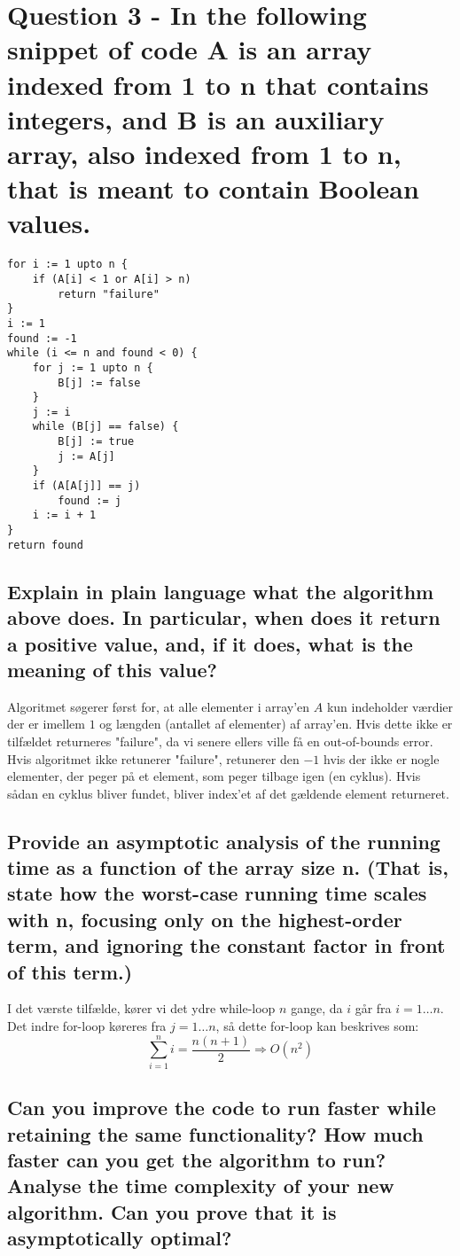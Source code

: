 \documentclass[a4paper,12pt]{article}
\begin{document}
\section[Question 3]{Question 3 - In the following snippet of code A is an array indexed from 1 to n that contains integers,
and B is an auxiliary array, also indexed from 1 to n, that is meant to contain Boolean values.}

\begin{lstlisting}
for i := 1 upto n {
    if (A[i] < 1 or A[i] > n)
        return "failure"
}
i := 1
found := -1
while (i <= n and found < 0) {
    for j := 1 upto n {
        B[j] := false
    }
    j := i
    while (B[j] == false) {
        B[j] := true
        j := A[j]
    }
    if (A[A[j]] == j)
        found := j
    i := i + 1
}
return found
\end{lstlisting}
    
\subsection[]{Explain in plain language what the algorithm above does. In particular, when does it
return a positive value, and, if it does, what is the meaning of this value?}
    
Algoritmet søgerer først for, at alle elementer i array'en $A$ kun indeholder værdier der er imellem $1$ og længden (antallet af elementer) af array'en. Hvis dette ikke er tilfældet returneres "failure", da vi senere ellers ville få en out-of-bounds error. Hvis algoritmet ikke retunerer "failure", retunerer den $-1$ hvis der ikke er nogle elementer, der peger på et element, som peger tilbage igen (en cyklus). Hvis sådan en cyklus bliver fundet, bliver index'et af det gældende element returneret.
    
\subsection[]{Provide an asymptotic analysis of the running time as a function of the array size n. (That
is, state how the worst-case running time scales with n, focusing only on the highest-order
term, and ignoring the constant factor in front of this term.)}

I det værste tilfælde, kører vi det ydre while-loop $n$ gange, da $i$ går fra $i=1\dots n$. Det indre for-loop køreres fra $j=1\dots n$, så dette for-loop kan beskrives som:
\[\sum_{i=1}^{n}i = \dfrac{n(n+1)}{2} \Rightarrow O(n^2)\]

\subsection[]{Can you improve the code to run faster while retaining the same functionality? How
much faster can you get the algorithm to run? Analyse the time complexity of your new
algorithm. Can you prove that it is asymptotically optimal?}
\end{document}
